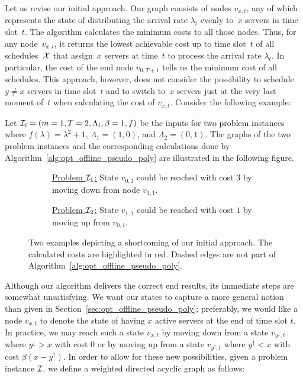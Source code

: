 Let us revise our initial approach. Our graph consists of nodes $v_{x,t}$, any of which represents the state of distributing the arrival rate $\lambda_{t}$ evenly to~$x$ servers in time slot~$t$. The algorithm calculates the minimum costs to all those nodes. Thus, for any node~$v_{x,t}$, it returns the lowest achievable cost up to time slot~$t$ of all schedules~$\mathcal{X}$ that assign~$x$ servers at time~$t$ to process the arrival rate $\lambda_t$. In particular, the cost of the end node $v_{0,T+1}$ tells us the minimum cost of all schedules. This approach, however, does not consider the possibility to schedule $y\neq x$ servers in time slot~$t$ and to switch to~$x$ servers just at the very last moment of~$t$ when calculating the cost of $v_{x,t}$. Consider the following example:
\begin{exmpl}
Let $\mathcal{I}_i=(m=1,T=2,\Lambda_i,\beta=1,f)$ be the inputs for two problem instances where $f(\lambda)=\lambda^2+1$, $\Lambda_1=(1,0)$, and $\Lambda_2=(0,1)$. The graphs of the two problem instances and the corresponding calculations done by Algorithm~\ref{alg:opt_offline_pseudo_poly} are illustrated in the following figure.
\begin{figure}[H]
\captionsetup[subfigure]{labelformat=empty}
\begin{subfigure}[b]{0.48\textwidth}

\caption{\underline{Problem $\mathcal{I}_1$:} State $v_{0,1}$ could be reached with cost $3$ by moving down from node $v_{1,1}$.}
\end{subfigure}
\hfill
\begin{subfigure}[b]{0.48\textwidth}

\caption{\underline{Problem $\mathcal{I}_2$:} State $v_{1,1}$ could be reached with cost $1$ by moving up from $v_{0,1}$.}
\end{subfigure}
\caption{Two examples depicting a shortcoming of our initial approach. The calculated costs are highlighted in red. Dashed edges are not part of Algorithm~\ref{alg:opt_offline_pseudo_poly}.}
\end{figure}
\end{exmpl}
Although our algorithm delivers the correct end results, its immediate steps are somewhat unsatisfying. We want our states to capture a more general notion than given in Section~\ref{sec:opt_offline_pseudo_poly}; preferably, we would like a node $v_{x,t}$ to denote the state of having $x$ active servers at the end of time slot $t$. In practice, we may reach such a state $v_{x,t}$ by moving down from a state $v_{y^\downarrow,t}$ where $y^\downarrow>x$ with cost $0$ or by moving up from a state $v_{y^\uparrow,t}$ where $y^\uparrow<x$ with cost $\beta(x-y^\uparrow)$. In order to allow for these new possibilities, given a problem instance $\mathcal{I}$, we define a weighted directed acyclic graph as follows:
